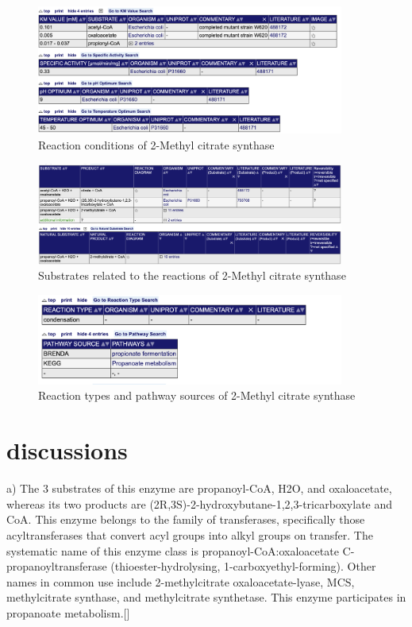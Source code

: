 \documentclass[a4paper,english,12pt,bibliography=totoc]{scrreprt}
\begin{document}
\begin{figure}
    \centering
    \includegraphics[width = 0.9\textwidth]{Project 4/Brenda figures/reaction conditions.png}
    \caption{Reaction conditions of 2-Methyl citrate synthase}
\end{figure}

\begin{figure}
    \centering
    \includegraphics[width =0.9\textwidth]{Project 4/Brenda figures/substrates.png}
    \caption{Substrates related to the reactions of 2-Methyl citrate synthase}
\end{figure}

\begin{figure}
    \centering
    \includegraphics[width = 0.9\textwidth]{Project 4/Brenda figures/Reaction type and pathway source.png}
    \caption{Reaction types and pathway sources of 2-Methyl citrate synthase}
\end{figure}

\section{discussions}

a) The 3 substrates of this enzyme are propanoyl-CoA, H2O, and oxaloacetate, whereas its two products are (2R,3S)-2-hydroxybutane-1,2,3-tricarboxylate and CoA. This enzyme belongs to the family of transferases, specifically those acyltransferases that convert acyl groups into alkyl groups on transfer. The systematic name of this enzyme class is propanoyl-CoA:oxaloacetate C-propanoyltransferase (thioester-hydrolysing, 1-carboxyethyl-forming). Other names in common use include 2-methylcitrate oxaloacetate-lyase, MCS, methylcitrate synthase, and methylcitrate synthetase. This enzyme participates in propanoate metabolism.[\cite{chang_brenda_2021}] \\
\end{document}
